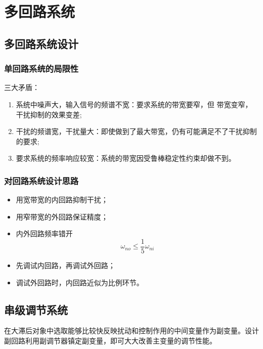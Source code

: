 \documentclass[14pt,a4paper]{article}
\theoremstyle{plain}
\theoremstyle{definition}
\theoremstyle{remark}
\theoremstyle{plain}
\theoremstyle{plain}
\theoremstyle{definition}
\begin{document}
	\newpage
	\section{多回路系统}%
	\label{sec:多回路系统}

		\subsection{多回路系统设计}%
		\label{sub:多回路系统设计}
		
			\subsubsection{单回路系统的局限性}%
			\label{ssub:单回路系统的局限性}
	
				三大矛盾：
				\begin{enumerate}
					\item 系统中噪声大，输入信号的频谱不宽：要求系统的带宽要窄，但 带宽变窄，干扰抑制的效果变差;
					\item 干扰的频谱宽，干扰量大：即使做到了最大带宽，仍有可能满足不了干扰抑制的要求; 
					\item 要求系统的频率响应较宽：系统的带宽因受鲁棒稳定性约束却做不到。
				\end{enumerate} 

			\subsubsection{对回路系统设计思路}%
			\label{ssub:对回路系统设计思路}
			
			\begin{itemize}
				\item 用宽带宽的内回路抑制干扰；
				\item 用窄带宽的外回路保证精度；
				\item 内外回路频率错开
					\[
					\omega_{no} \le \dfrac{1}{5} \omega_{ni}
					\] 
				\item 先调试内回路，再调试外回路；
				\item 调试外回路时，内回路近似为比例环节。
			\end{itemize} 

		\subsection{串级调节系统}%
		\label{sub:串级调节系统}
		
			在大滞后对象中选取能够比较快反映扰动和控制作用的中间变量作为副变量。设计副回路利用副调节器镇定副变量，即可大大改善主变量的调节性能。 
\end{document}
